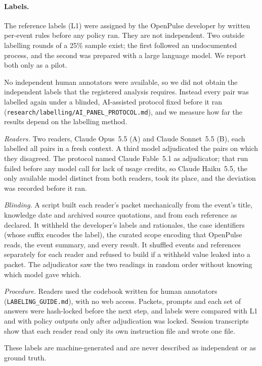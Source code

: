 \documentclass[11pt]{article}
\newcommand{\code}[1]{\texttt{#1}}
\begin{document}


\paragraph{Labels.} The reference labels (L1) were assigned by the OpenPulse
developer by written per-event rules before any policy ran. They are not
independent. Two outside labelling rounds of a 25\% sample exist; the first
followed an undocumented process, and the second was prepared with a large
language model. We report both only as a pilot.

No independent human annotators were available, so we did not obtain the
independent labels that the registered analysis requires. Instead every pair
was labelled again under a blinded, AI-assisted protocol fixed before it ran
(\code{research/labelling/AI\_PANEL\_PROTOCOL.md}), and we measure how far the
results depend on the labelling method.

\emph{Readers.} Two readers, Claude Opus~5.5 (A) and Claude Sonnet~5.5 (B),
each labelled all \RetroPairs{} pairs in a fresh context. A third model
adjudicated the pairs on which they disagreed. The protocol named Claude
Fable~5.1 as adjudicator; that run failed before any model call for lack of
usage credits, so Claude Haiku~5.5, the only available model distinct from
both readers, took its place, and the deviation was recorded before it ran.

\emph{Blinding.} A script built each reader's packet mechanically from the
event's title, knowledge date and archived source quotations, and from each
reference as declared. It withheld the developer's labels and rationales, the
case identifiers (whose suffix encodes the label), the curated scope encoding
that OpenPulse reads, the event summary, and every result. It shuffled events
and references separately for each reader and refused to build if a withheld
value leaked into a packet. The adjudicator saw the two readings in random
order without knowing which model gave which.

\emph{Procedure.} Readers used the codebook written for human annotators
(\code{LABELING\_GUIDE.md}), with no web access. Packets, prompts and each set
of answers were hash-locked before the next step, and labels were compared
with L1 and with policy outputs only after adjudication was locked. Session
transcripts show that each reader read only its own instruction file and wrote
one file.

These labels are machine-generated and are never described as independent or
as ground truth.
\end{document}

